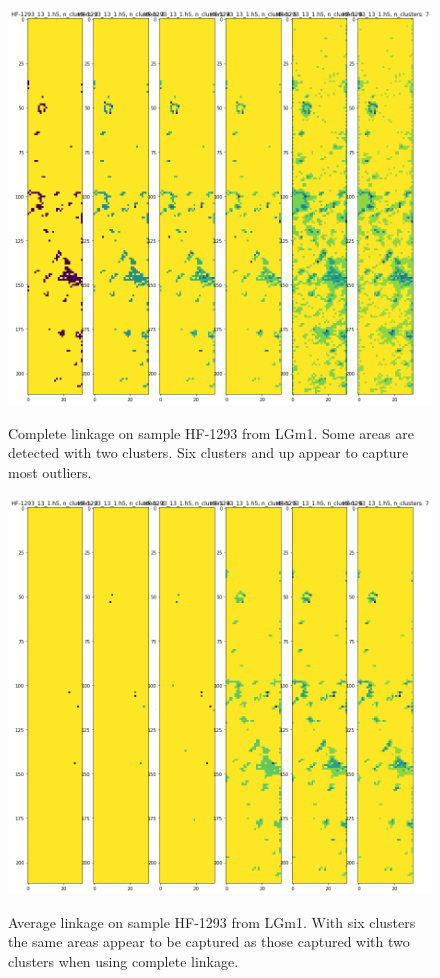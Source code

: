 \documentclass[a4paper, 12pt, oneside]{book}
\begin{document}
\begin{appendices}
\begin{figure}[H]
\end{figure}

\begin{figure}[H]

    \centering
{\includegraphics[width=15cm]{images/Complete_linkage/LGm-1/HF-1293_13_1.h5_1.png} }
\caption{Complete linkage on sample HF-1293 from LGm1. Some areas are detected with two clusters. Six clusters and up appear to capture most outliers. \label{fig:SL_HF868}}%

\end{figure}

\begin{figure}[H]

    \centering
{\includegraphics[width=15cm]{images/Average_linkage/LGm-1/HF-1293_13_1.h5_1.png} }
\caption{Average linkage on sample HF-1293 from LGm1. With six clusters the same areas appear to be captured as those captured with two clusters when using complete linkage. \label{fig:SL_HF868}}%


\end{figure}
\end{appendices}
\end{document}
